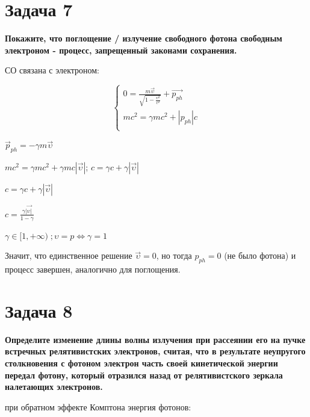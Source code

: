\documentclass[14pt,a4paper]{article}
\begin{document}
\section*{Задача 7}
    
    \par \textbf{Покажите, что поглощение / излучение свободного фотона свободным электроном - процесс, запрещенный законами сохранения.}\\

    \par 

    СО связана с электроном:

    \begin{equation}
        \begin{cases}
            0 = \frac{m \vec{\upsilon}}{\sqrt{1 - \frac{\upsilon^2}{c^2}}} + \vec{p_{ph}} \\
            mc^2 = \gamma mc^2 + |p_{ph}|c \\
        \end{cases}
    \end{equation}

    $\vec{p}_{ph} = -\gamma m \vec{\upsilon}$

    $mc^2 = \gamma m c^2 + \gamma mc |\vec{\upsilon}|$; $c = \gamma c + \gamma |\vec{\upsilon}|$

    $c = \gamma c + \gamma |\vec{\upsilon}|$

    $c = \frac{\gamma |\vec{\upsilon|}}{1-\gamma}$

    $\gamma \in [1, + \infty)\;; \upsilon = p \Leftrightarrow \gamma=1$

    Значит, что единственное решение $\vec{\upsilon} = 0$, но тогда $p_{ph} = 0$ (не было фотона) и процесс завершен, аналогично для поглощения.

\section*{Задача 8}
    
    \par \textbf{Определите изменение длины волны излучения при рассеянии его на пучке встречных релятивистских электронов, считая, что в результате неупругого столкновения с фотоном электрон часть своей кинетической энергии передал фотону, который отразился назад от релятивистского зеркала налетающих электронов.}\\
    
    \par при обратном эффекте Комптона энергия фотонов:\\
    
\end{document}
